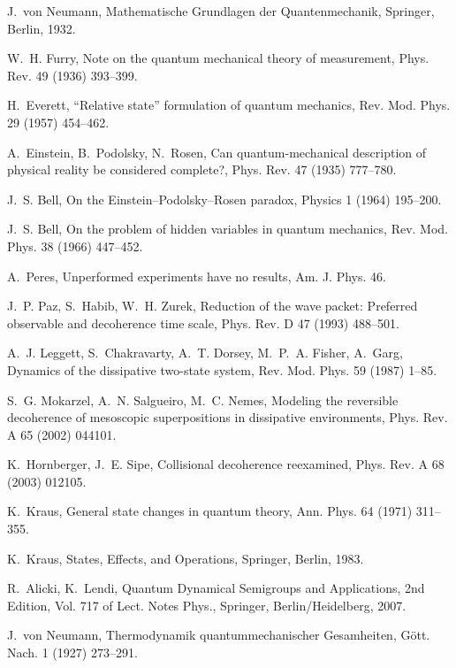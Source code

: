\documentclass[3p,sort&compress,12pt]{elsarticle}
\begin{document}
\begin{thebibliography}{100}
J.~von Neumann, Mathematische {G}rundlagen der {Q}uantenmechanik, Springer,
  Berlin, 1932.

W.~H. Furry, Note on the quantum mechanical theory of measurement, Phys. Rev.
  49 (1936) 393--399.

H.~Everett, ``{R}elative state'' formulation of quantum mechanics, Rev. Mod.
  Phys. 29 (1957) 454--462.

A.~Einstein, B.~Podolsky, N.~Rosen, Can quantum-mechanical description of
  physical reality be considered complete?, Phys. Rev. 47 (1935) 777--780.

J.~S. Bell, On the {E}instein--{P}odolsky--{R}osen paradox, Physics 1 (1964)
  195--200.

J.~S. Bell, On the problem of hidden variables in quantum mechanics, Rev. Mod.
  Phys. 38 (1966) 447--452.

A.~Peres, Unperformed experiments have no results, Am. J. Phys. 46.

J.~P. Paz, S.~Habib, W.~H. Zurek, Reduction of the wave packet: {P}referred
  observable and decoherence time scale, Phys. Rev. D 47 (1993) 488--501.

A.~J. Leggett, S.~Chakravarty, A.~T. Dorsey, M.~P.~A. Fisher, A.~Garg, Dynamics
  of the dissipative two-state system, Rev. Mod. Phys. 59 (1987) 1--85.

S.~G. Mokarzel, A.~N. Salgueiro, M.~C. Nemes, Modeling the reversible
  decoherence of mesoscopic superpositions in dissipative environments, Phys.
  Rev. A 65 (2002) 044101.

K.~Hornberger, J.~E. Sipe, Collisional decoherence reexamined, Phys. Rev. A 68
  (2003) 012105.

K.~Kraus, General state changes in quantum theory, Ann. Phys. 64 (1971)
  311--355.

K.~Kraus, States, Effects, and Operations, Springer, Berlin, 1983.

R.~Alicki, K.~Lendi, Quantum Dynamical Semigroups and Applications, 2nd
  Edition, Vol. 717 of Lect. Notes Phys., Springer, Berlin/Heidelberg, 2007.

J.~von Neumann, Thermodynamik quantummechanischer {G}esamheiten, G{\"o}tt.
  Nach. 1 (1927) 273--291.


\end{thebibliography}
\end{document}
